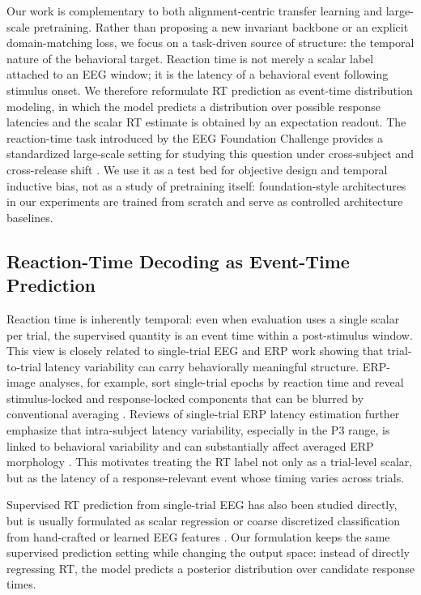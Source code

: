 \documentclass[12pt]{article}
\begin{document}
Our work is complementary to both alignment-centric transfer learning and large-scale
pretraining. Rather than proposing a new invariant backbone or an explicit
domain-matching loss, we focus on a task-driven source of structure: the temporal nature
of the behavioral target. Reaction time is not merely a scalar label attached to an EEG
window; it is the latency of a behavioral event following stimulus onset. We therefore
reformulate RT prediction as event-time distribution modeling, in which the model
predicts a distribution over possible response latencies and the scalar RT estimate is
obtained by an expectation readout. The reaction-time task introduced by the EEG
Foundation Challenge provides a standardized large-scale setting for studying this
question under cross-subject and cross-release shift
\citep{EEGChallengeWebsite2025,EEGFoundationChallengeArxiv2025}. We use it as a
test bed for objective design and temporal inductive bias, not as a study of
pretraining itself: foundation-style architectures in our experiments are trained from
scratch and serve as controlled architecture baselines.

\subsection{Reaction-Time Decoding as Event-Time Prediction}
Reaction time is inherently temporal: even when evaluation uses a single scalar per
trial, the supervised quantity is an event time within a post-stimulus window. This view
is closely related to single-trial EEG and ERP work showing that trial-to-trial latency
variability can carry behaviorally meaningful structure. ERP-image analyses, for
example, sort single-trial epochs by reaction time and reveal stimulus-locked and
response-locked components that can be blurred by conventional averaging
\citep{Jung1998SingleTrialERP}. Reviews of single-trial ERP latency estimation further
emphasize that intra-subject latency variability, especially in the P3 range, is linked to
behavioral variability and can substantially affect averaged ERP morphology
\citep{Ouyang2017LatencyReview}. This motivates treating the RT label not only as a
trial-level scalar, but as the latency of a response-relevant event whose timing varies
across trials.

Supervised RT prediction from single-trial EEG has also been studied directly, but is
usually formulated as scalar regression or coarse discretized classification from
hand-crafted or learned EEG features \citep{Chowdhury2020RTSensors}. Our formulation
keeps the same supervised prediction setting while changing the output space: instead of
directly regressing RT, the model predicts a posterior distribution over candidate
response times.
\end{document}
